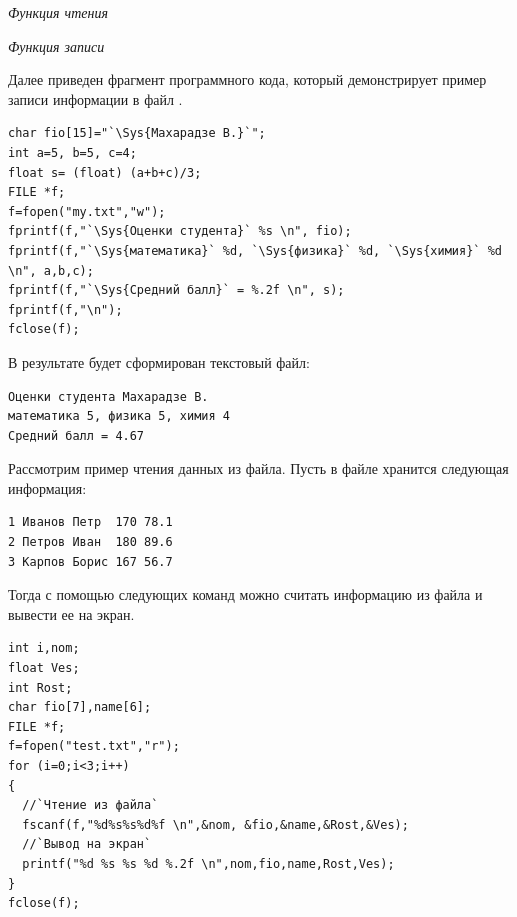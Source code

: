 \emph{Функция чтения}


\emph{Функция записи}


Далее приведен фрагмент программного кода, который демонстрирует пример записи информации в файл
.
\begin{lstlisting}
char fio[15]="`\Sys{Махарадзе В.}`";
int a=5, b=5, c=4;
float s= (float) (a+b+c)/3;
FILE *f;
f=fopen("my.txt","w");
fprintf(f,"`\Sys{Оценки студента}` %s \n", fio);
fprintf(f,"`\Sys{математика}` %d, `\Sys{физика}` %d, `\Sys{химия}` %d \n", a,b,c);
fprintf(f,"`\Sys{Средний балл}` = %.2f \n", s);
fprintf(f,"\n");
fclose(f);
\end{lstlisting}

В результате будет сформирован текстовый файл:
\begin{verbatim}
Оценки студента Махарадзе В.
математика 5, физика 5, химия 4
Средний балл = 4.67
\end{verbatim}

Рассмотрим пример чтения данных из файла. Пусть в файле  хранится следующая информация:
\begin{verbatim}
1 Иванов Петр  170 78.1
2 Петров Иван  180 89.6
3 Карпов Борис 167 56.7
\end{verbatim}

Тогда с помощью следующих команд можно считать информацию из файла и вывести ее на экран.
\begin{lstlisting}
int i,nom;
float Ves;
int Rost;
char fio[7],name[6];
FILE *f;	
f=fopen("test.txt","r");
for (i=0;i<3;i++)
{
  //`Чтение из файла`
  fscanf(f,"%d%s%s%d%f \n",&nom, &fio,&name,&Rost,&Ves);
  //`Вывод на экран`
  printf("%d %s %s %d %.2f \n",nom,fio,name,Rost,Ves);
}
fclose(f);
\end{lstlisting}
